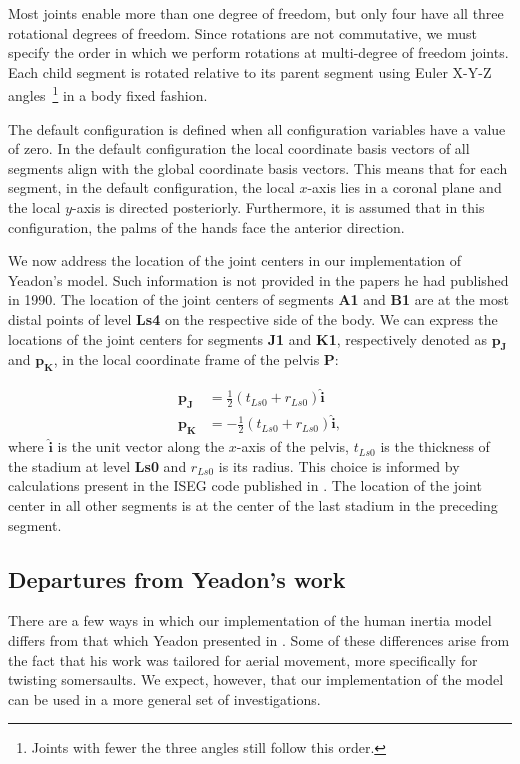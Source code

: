 \documentclass[10pt]{article}
\begin{document}
Most joints enable more than one degree of freedom, but only four have all
three rotational degrees of freedom. Since rotations are not commutative, we
must specify the order in which we perform rotations at multi-degree of freedom
joints. Each child segment is rotated relative to its parent segment using
Euler X-Y-Z angles~\footnote{Joints with fewer the three angles still follow
this order.} in a body fixed fashion.

The default configuration is defined when all configuration variables have a
value of zero. In the default configuration the local coordinate basis vectors
of all segments align with the global coordinate basis vectors. This means that
for each segment, in the default configuration, the local $x$-axis lies in a
coronal plane and the local $y$-axis is directed posteriorly. Furthermore, it
is assumed that in this configuration, the palms of the hands face the anterior
direction.

We now address the location of the joint centers in our implementation of
Yeadon's model. Such information is not provided in the papers he had published
in 1990. The location of the joint centers of segments \textbf{A1} and
\textbf{B1} are at the most distal points of level \textbf{Ls4} on the
respective side of the body. We can express the locations of the joint centers
for segments \textbf{J1} and \textbf{K1}, respectively denoted as
$\mathbf{p_J}$ and $\mathbf{p_K}$, in the local coordinate frame of the pelvis
\textbf{P}:

\begin{align}
    \mathbf{p_J} &= \frac{1}{2} (t_{Ls0} + r_{Ls0})\mathbf{\hat{i}} \\
    \mathbf{p_K} &= -\frac{1}{2} (t_{Ls0} + r_{Ls0})\mathbf{\hat{i}},
\end{align}
where $\mathbf{\hat{i}}$ is the unit vector along the $x$-axis of the pelvis,
$t_{Ls0}$ is the thickness of the stadium at level \textbf{Ls0} and $r_{Ls0}$
is its radius. This choice is informed by calculations present in the ISEG code
published in \cite{Yeadon1984a}. The location of the joint center in all other
segments is at the center of the last stadium in the preceding segment.

\subsection*{Departures from Yeadon's work}

There are a few ways in which our implementation of the human inertia model
differs from that which Yeadon presented in \cite{Yeadon1990c, Yeadon1990f,
Yeadon1990e, Yeadon1990d}. Some of these differences arise from the fact that
his work was tailored for aerial movement, more specifically for twisting
somersaults. We expect, however, that our implementation of the model can be
used in a more general set of investigations.
\end{document}
